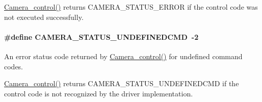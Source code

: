 \hyperlink{_camera_8h_adfc7e9a60daa499220296a238a09b393}{Camera\+\_\+control()} returns C\+A\+M\+E\+R\+A\+\_\+\+S\+T\+A\+T\+U\+S\+\_\+\+E\+R\+R\+O\+R if the control code was not executed successfully. 
\paragraph[{C\+A\+M\+E\+R\+A\+\_\+\+S\+T\+A\+T\+U\+S\+\_\+\+U\+N\+D\+E\+F\+I\+N\+E\+D\+C\+M\+D}]{\setlength{\rightskip}{0pt plus 5cm}\#define C\+A\+M\+E\+R\+A\+\_\+\+S\+T\+A\+T\+U\+S\+\_\+\+U\+N\+D\+E\+F\+I\+N\+E\+D\+C\+M\+D~-\/2}\label{group___camera___s_t_a_t_u_s_gaae8cae4253d68cc8ae921b63a74d1cb9}


An error status code returned by \hyperlink{_camera_8h_adfc7e9a60daa499220296a238a09b393}{Camera\+\_\+control()} for undefined command codes. 

\hyperlink{_camera_8h_adfc7e9a60daa499220296a238a09b393}{Camera\+\_\+control()} returns C\+A\+M\+E\+R\+A\+\_\+\+S\+T\+A\+T\+U\+S\+\_\+\+U\+N\+D\+E\+F\+I\+N\+E\+D\+C\+M\+D if the control code is not recognized by the driver implementation. 